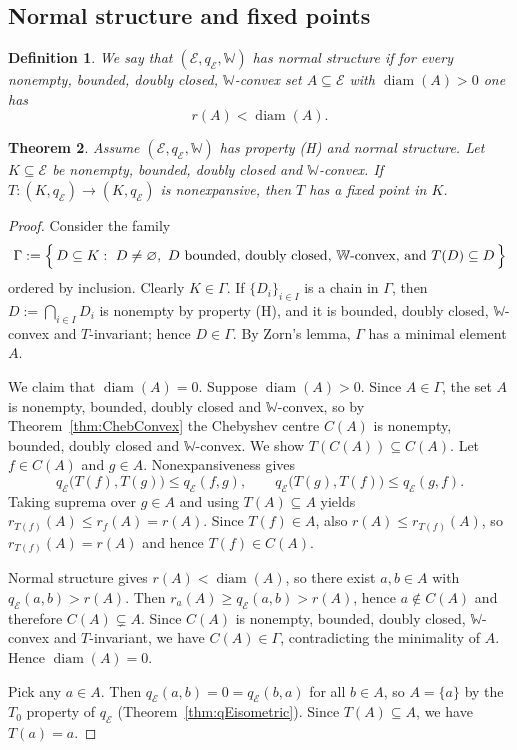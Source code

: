 \documentclass[preprint,12pt]{elsarticle}
\numberwithin{equation}{section}
\newtheorem{theorem}{Theorem}[section]
\newtheorem{definition}[theorem]{Definition}
\newcommand{\E}{\mathcal{E}}
\newcommand{\diam}{\operatorname{diam}}
\begin{document}
\subsection{Normal structure and fixed points}

\begin{definition}\label{def:NormalHull}
We say that $(\E,q_{\E},\mathbb{W})$ has \emph{normal structure} if for every nonempty, bounded,
doubly closed, $\mathbb{W}$-convex set $A\subseteq \E$ with $\diam(A)>0$ one has
\[
r(A)<\diam(A).
\]
\end{definition}

\begin{theorem}\label{thm:FixHull}
Assume $(\E,q_{\E},\mathbb{W})$ has property {\rm(H)} and normal structure.
Let $K\subseteq \E$ be nonempty, bounded, doubly closed and $\mathbb{W}$-convex.
If $T:(K,q_{\E})\to (K,q_{\E})$ is nonexpansive, then $T$ has a fixed point in $K$.
\end{theorem}

\begin{proof}
Consider the family
\[
\Gamma:=\Bigl\{\,D\subseteq K:\ D\neq\varnothing,\ D\ \text{bounded, doubly closed, $\mathbb{W}$-convex, and } T(D)\subseteq D\,\Bigr\}
\]
ordered by inclusion. Clearly $K\in\Gamma$. If $\{D_i\}_{i\in I}$ is a chain in $\Gamma$, then
$D:=\bigcap_{i\in I}D_i$ is nonempty by property {\rm(H)}, and it is bounded, doubly closed,
$\mathbb{W}$-convex and $T$-invariant; hence $D\in\Gamma$. By Zorn's lemma, $\Gamma$ has a minimal element $A$.

We claim that $\diam(A)=0$. Suppose $\diam(A)>0$. Since $A\in\Gamma$, the set $A$ is nonempty, bounded,
doubly closed and $\mathbb{W}$-convex, so by Theorem~\ref{thm:ChebConvex} the Chebyshev centre $C(A)$ is
nonempty, bounded, doubly closed and $\mathbb{W}$-convex. We show $T(C(A))\subseteq C(A)$.
Let $f\in C(A)$ and $g\in A$. Nonexpansiveness gives
\[
q_{\E}\bigl(T(f),T(g)\bigr)\le q_{\E}(f,g),\qquad q_{\E}\bigl(T(g),T(f)\bigr)\le q_{\E}(g,f).
\]
Taking suprema over $g\in A$ and using $T(A)\subseteq A$ yields $r_{T(f)}(A)\le r_f(A)=r(A)$.
Since $T(f)\in A$, also $r(A)\le r_{T(f)}(A)$, so $r_{T(f)}(A)=r(A)$ and hence $T(f)\in C(A)$.

Normal structure gives $r(A)<\diam(A)$, so there exist $a,b\in A$ with $q_{\E}(a,b)>r(A)$.
Then $r_a(A)\ge q_{\E}(a,b)>r(A)$, hence $a\notin C(A)$ and therefore $C(A)\subsetneq A$.
Since $C(A)$ is nonempty, bounded, doubly closed, $\mathbb{W}$-convex and $T$-invariant, we have $C(A)\in\Gamma$,
contradicting the minimality of $A$. Hence $\diam(A)=0$.

Pick any $a\in A$. Then $q_{\E}(a,b)=0=q_{\E}(b,a)$ for all $b\in A$, so $A=\{a\}$ by the $T_{0}$ property
of $q_{\E}$ (Theorem~\ref{thm:qEisometric}). Since $T(A)\subseteq A$, we have $T(a)=a$.
\end{proof}
\end{document}
